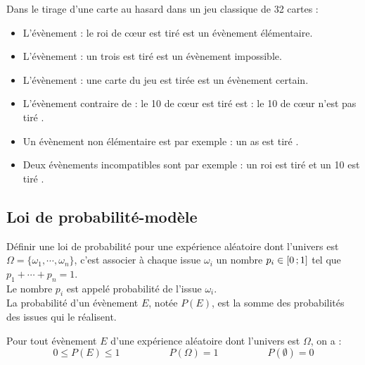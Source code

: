 \begin{Exemple}
Dans le tirage d'une carte au hasard dans un jeu classique de 32 cartes :
\begin{itemize}[label=\textcolor{Couleur8}{$\bullet$}]
\item L'évènement : \og le roi de c{\oe}ur est tiré \fg{} est un évènement élémentaire.
\item L'évènement : \og un trois est tiré \fg{} est un évènement impossible.
\item L'évènement : \og une carte du jeu est tirée \fg{} est un évènement certain.
\item L'évènement contraire de : \og le 10 de c{\oe}ur est tiré \fg{} est : \og le 10 de c{\oe}ur n'est pas tiré \fg{}.
\item Un évènement non élémentaire est par exemple : \og un as est tiré \fg{}.
\item Deux évènements incompatibles sont par exemple : \og un roi est tiré \fg{} et \og un 10 est tiré \fg{}.
\end{itemize}


\end{Exemple}

\newpage

\subsection{Loi de probabilité-modèle}
\vspace{0.3cm}
\begin{Définition}
Définir une loi de probabilité pour une expérience aléatoire dont l'univers est $\Omega=\{\omega_1,\cdots,\omega_n\}$, c'est associer à chaque issue $\omega_i$ un nombre $p_i\in \mathopen{[}0\,;1\mathclose{]}$ tel que $p_1+\cdots+ p_n=1$.\\
Le nombre $p_i$ est appelé probabilité de l'issue $\omega_i$.\\
La probabilité d'un évènement $E$, notée $P(E)$, est la somme des probabilités des issues qui le réalisent.

\end{Définition}
\vspace{0.3cm}
\begin{Propriété}
Pour tout évènement $E$ d'une expérience aléatoire dont l'univers est $\Omega$, on a :
$$0\leq P(E)\leq 1 \quad\quad\quad\quad\quad P(\Omega)=1 \quad\quad\quad\quad\quad P(\emptyset)=0$$
\end{Propriété}
\vspace{0.3cm}

